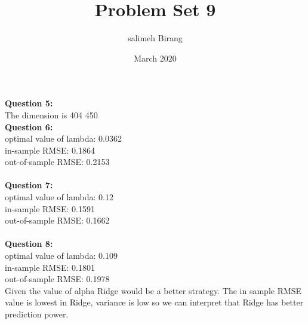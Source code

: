 \documentclass{article}
\title{Problem Set 9}
\author{salimeh Birang }
\date{March 2020}
\begin{document}
\maketitle
\noindent
\textbf{Question 5:}\\
The dimension is 404 450\\

\noindent
\textbf{Question 6:}\\
optimal value of lambda: 0.0362\\
in-sample RMSE: 0.1864\\
out-of-sample RMSE: 0.2153\\
\\

\noindent
\textbf{Question 7:}\\
optimal value of lambda: 0.12\\
in-sample RMSE: 0.1591\\
out-of-sample RMSE: 0.1662\\
\\

\noindent
\textbf{Question 8:}\\
optimal value of lambda: 0.109\\
in-sample RMSE: 0.1801\\
out-of-sample RMSE: 0.1978\\
Given the value of alpha Ridge would be a better strategy. 
The in sample RMSE value is lowest in Ridge, variance is low so we can interpret that Ridge has better prediction power.
\end{document}
